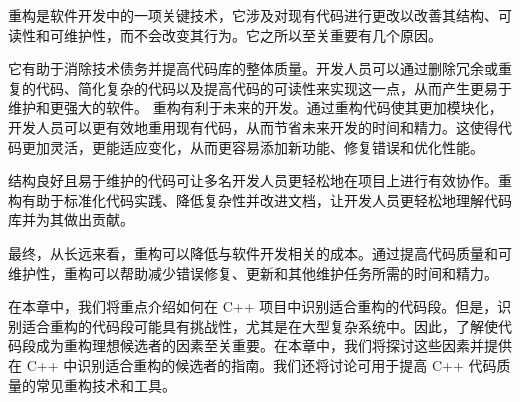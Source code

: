重构是软件开发中的一项关键技术，它涉及对现有代码进行更改以改善其结构、可读性和可维护性，而不会改变其行为。它之所以至关重要有几个原因。

它有助于消除技术债务并提高代码库的整体质量。开发人员可以通过删除冗余或重复的代码、简化复杂的代码以及提高代码的可读性来实现这一点，从而产生更易于维护和更强大的软件。
重构有利于未来的开发。通过重构代码使其更加模块化，开发人员可以更有效地重用现有代码，从而节省未来开发的时间和精力。这使得代码更加灵活，更能适应变化，从而更容易添加新功能、修复错误和优化性能。

结构良好且易于维护的代码可让多名开发人员更轻松地在项目上进行有效协作。重构有助于标准化代码实践、降低复杂性并改进文档，让开发人员更轻松地理解代码库并为其做出贡献。

最终，从长远来看，重构可以降低与软件开发相关的成本。通过提高代码质量和可维护性，重构可以帮助减少错误修复、更新和其他维护任务所需的时间和精力。

在本章中，我们将重点介绍如何在 C++ 项目中识别适合重构的代码段。但是，识别适合重构的代码段可能具有挑战性，尤其是在大型复杂系统中。因此，了解使代码段成为重构理想候选者的因素至关重要。在本章中，我们将探讨这些因素并提供在 C++ 中识别适合重构的候选者的指南。我们还将讨论可用于提高 C++ 代码质量的常见重构技术和工具。